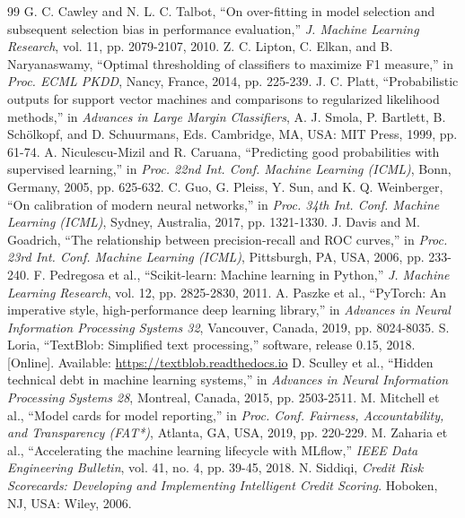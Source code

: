\begin{thebibliography}{99}
 G. C. Cawley and N. L. C. Talbot, ``On over-fitting in model selection and subsequent selection bias in performance evaluation,'' \emph{J. Machine Learning Research}, vol. 11, pp. 2079-2107, 2010.
 Z. C. Lipton, C. Elkan, and B. Naryanaswamy, ``Optimal thresholding of classifiers to maximize F1 measure,'' in \emph{Proc. ECML PKDD}, Nancy, France, 2014, pp. 225-239.
 J. C. Platt, ``Probabilistic outputs for support vector machines and comparisons to regularized likelihood methods,'' in \emph{Advances in Large Margin Classifiers}, A. J. Smola, P. Bartlett, B. Sch\"olkopf, and D. Schuurmans, Eds. Cambridge, MA, USA: MIT Press, 1999, pp. 61-74.
 A. Niculescu-Mizil and R. Caruana, ``Predicting good probabilities with supervised learning,'' in \emph{Proc. 22nd Int. Conf. Machine Learning (ICML)}, Bonn, Germany, 2005, pp. 625-632.
 C. Guo, G. Pleiss, Y. Sun, and K. Q. Weinberger, ``On calibration of modern neural networks,'' in \emph{Proc. 34th Int. Conf. Machine Learning (ICML)}, Sydney, Australia, 2017, pp. 1321-1330.
 J. Davis and M. Goadrich, ``The relationship between precision-recall and ROC curves,'' in \emph{Proc. 23rd Int. Conf. Machine Learning (ICML)}, Pittsburgh, PA, USA, 2006, pp. 233-240.
 F. Pedregosa et al., ``Scikit-learn: Machine learning in Python,'' \emph{J. Machine Learning Research}, vol. 12, pp. 2825-2830, 2011.
 A. Paszke et al., ``PyTorch: An imperative style, high-performance deep learning library,'' in \emph{Advances in Neural Information Processing Systems 32}, Vancouver, Canada, 2019, pp. 8024-8035.
 S. Loria, ``TextBlob: Simplified text processing,'' software, release 0.15, 2018. [Online]. Available: \url{https://textblob.readthedocs.io}
 D. Sculley et al., ``Hidden technical debt in machine learning systems,'' in \emph{Advances in Neural Information Processing Systems 28}, Montreal, Canada, 2015, pp. 2503-2511.
 M. Mitchell et al., ``Model cards for model reporting,'' in \emph{Proc. Conf. Fairness, Accountability, and Transparency (FAT*)}, Atlanta, GA, USA, 2019, pp. 220-229.
 M. Zaharia et al., ``Accelerating the machine learning lifecycle with MLflow,'' \emph{IEEE Data Engineering Bulletin}, vol. 41, no. 4, pp. 39-45, 2018.
 N. Siddiqi, \emph{Credit Risk Scorecards: Developing and Implementing Intelligent Credit Scoring}. Hoboken, NJ, USA: Wiley, 2006.
\end{thebibliography}
